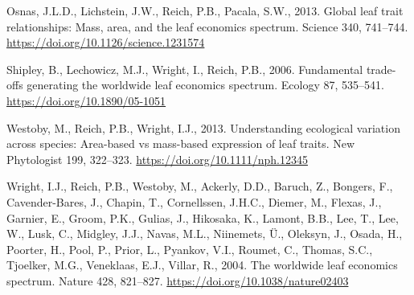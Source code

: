 \documentclass[
  12pt,
  letterpaper,
  DIV=11,
  numbers=noendperiod]{scrartcl}
\newlength{\cslhangindent}
\newlength{\cslentryspacingunit} %
\newenvironment{CSLReferences}[2] %
 {%
  \setlength{\parindent}{0pt}
  \ifodd #1
  \let\oldpar\par
  \def\par{\hangindent=\cslhangindent\oldpar}
  \fi
  \setlength{\parskip}{#2\cslentryspacingunit}
 }%
 {}
\begin{document}
\begin{CSLReferences}{1}{0}
\leavevmode{}%
Osnas, J.L.D., Lichstein, J.W., Reich, P.B., Pacala, S.W., 2013. Global
leaf trait relationships: {Mass}, area, and the leaf economics spectrum.
Science 340, 741--744. \url{https://doi.org/10.1126/science.1231574}

\leavevmode{}%
Shipley, B., Lechowicz, M.J., Wright, I., Reich, P.B., 2006. Fundamental
trade-offs generating the worldwide leaf economics spectrum. Ecology 87,
535--541. \url{https://doi.org/10.1890/05-1051}

\leavevmode{}%
Westoby, M., Reich, P.B., Wright, I.J., 2013. Understanding ecological
variation across species: {Area-based} vs mass-based expression of leaf
traits. New Phytologist 199, 322--323.
\url{https://doi.org/10.1111/nph.12345}

\leavevmode{}%
Wright, I.J., Reich, P.B., Westoby, M., Ackerly, D.D., Baruch, Z.,
Bongers, F., Cavender-Bares, J., Chapin, T., Cornellssen, J.H.C.,
Diemer, M., Flexas, J., Garnier, E., Groom, P.K., Gulias, J., Hikosaka,
K., Lamont, B.B., Lee, T., Lee, W., Lusk, C., Midgley, J.J., Navas,
M.L., Niinemets, Ü., Oleksyn, J., Osada, H., Poorter, H., Pool, P.,
Prior, L., Pyankov, V.I., Roumet, C., Thomas, S.C., Tjoelker, M.G.,
Veneklaas, E.J., Villar, R., 2004. The worldwide leaf economics
spectrum. Nature 428, 821--827.
\url{https://doi.org/10.1038/nature02403}

\end{CSLReferences}
\end{document}
